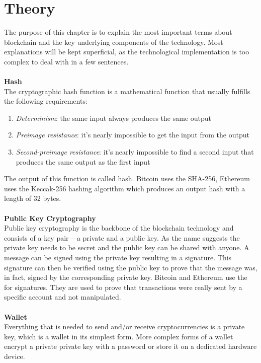 \section{Theory}
The purpose of this chapter is to explain the most important terms about blockchain and the key underlying components of the technology. Most explanations will be kept superficial, as the technological implementation is too complex to deal with in a few sentences.
\\\\

\textbf{Hash}\\
The cryptographic hash function is a mathematical function that usually fulfills the following requirements\cite{hash}:
\begin{enumerate}
    \item \textit{Determinism}: the same input always produces the same output
    \item \textit{Preimage resistance}: it's nearly impossible to get the input from the output
    \item \textit{Second-preimage resistance}: it's nearly impossible to find a second input that produces the same output as the first input
\end{enumerate}
The output of this function is called hash. Bitcoin uses the SHA-256\cite{bitcoin-whitepaper}, Ethereum uses the Keccak-256\cite{ethereum-yellow-paper} hashing algorithm which produces an output hash with a length of 32 bytes.
\\\\

\textbf{Public Key Cryptography}\\
Public key cryptography\cite{public-key-cryptography} is the backbone of the blockchain technology and consists of a key pair – a private and a public key. As the name suggests the private key needs to be secret and the public key can be shared with anyone. A message can be signed using the private key resulting in a signature. This signature can then be verified using the public key to prove that the message was, in fact, signed by the corresponding private key. Bitcoin and Ethereum use the  for signatures. They are used to prove that transactions were really sent by a specific account and not manipulated.
\\\\

\textbf{Wallet}\\
Everything that is needed to send and/or receive cryptocurrencies is a private key\cite{bitcoin-whitepaper}, which is a wallet in its simplest form. More complex forms of a wallet encrypt a private private key with a password or store it on a dedicated hardware device.
\\\\

